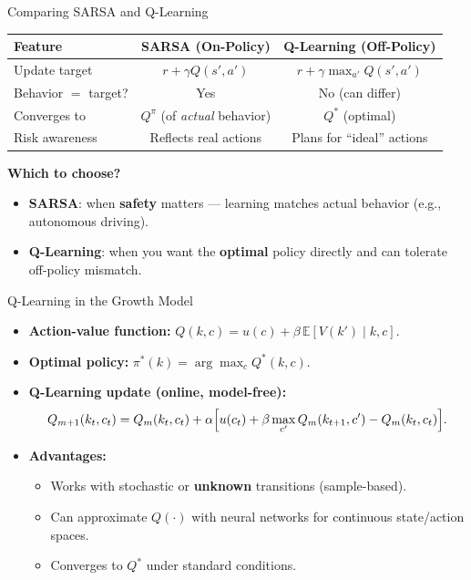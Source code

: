 \documentclass[10pt,english,aspectratio=169]{beamer}
\begin{document}
\begin{frame}{Comparing SARSA and Q-Learning}
    \begin{center}
    \small
    \begin{tabular}{lcc}
    \toprule
    \textbf{Feature} & \textbf{SARSA (On-Policy)} & \textbf{Q-Learning (Off-Policy)} \\
    \midrule
    Update target
        & $r + \gamma Q(s', a')$
        & $r + \gamma \max_{a'} Q(s', a')$ \\
    Behavior $=$ target?
        & Yes
        & No (can differ) \\
    Converges to
        & $Q^\pi$ (of \emph{actual} behavior)
        & $Q^*$ (optimal) \\
    Risk awareness
        & Reflects real actions
        & Plans for ``ideal'' actions \\
    \bottomrule
    \end{tabular}
    \end{center}

    \vspace{0.4cm}
    \textbf{Which to choose?}
    \begin{itemize}
        \item \textbf{SARSA}: when \textbf{safety} matters --- learning matches actual behavior (e.g., autonomous driving).
        \item \textbf{Q-Learning}: when you want the \textbf{optimal} policy directly and can tolerate off-policy mismatch.
    \end{itemize}
\end{frame}


\begin{frame}{Q-Learning in the Growth Model}
  \begin{itemize}
    \item \textbf{Action-value function:}
      $Q(k,c) = u(c) + \beta \,\mathbb{E}[V(k') \mid k,c]$.
    \item \textbf{Optimal policy:}
      $\pi^*(k) = \arg\max_c Q^*(k,c)$.
    \item \textbf{Q-Learning update (online, model-free):}
      \[
        Q_{m+1}(k_t,c_t)
        = Q_m(k_t,c_t)
        + \alpha \Bigl[u(c_t) + \beta \max_{c'} Q_m(k_{t+1},c')
        - Q_m(k_t,c_t)\Bigr].
      \]
    \item \textbf{Advantages:}
      \begin{itemize}
        \item Works with stochastic or \textbf{unknown} transitions (sample-based).
        \item Can approximate $Q(\cdot)$ with neural networks for continuous state/action spaces.
        \item Converges to $Q^*$ under standard conditions.
      \end{itemize}
  \end{itemize}
\end{frame}
\end{document}
